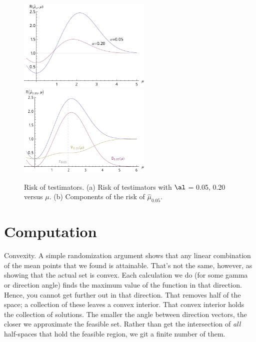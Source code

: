 \documentclass[12pt]{article}
\begin{document}
 \begin{figure}
 \caption{ \label{fig:risk} Risk of testimators. (a) Risk of testimators with
$\al$ = 0.05, 0.20 versus $\mu$. (b) Components of the risk of $\hat\mu_{0.05}$. }
 \centerline{ 
   \includegraphics[width=2.5in]{figures/risk_a}
   \includegraphics[width=2.5in]{figures/risk_b} }
 \end{figure}

 



\section{ Computation }

 
 Convexity. A simple randomization argument shows that any linear combination of
 the mean points that we found is attainable.  That's not the same, however, as
 showing that the actual set is convex.  Each calculation we do (for some gamma
 or direction angle) finds the maximum value of the function in that direction.
  Hence, you cannot get further out in that direction. That removes half of the
 space; a collection of these leaves a convex interior.  That convex interior
 holds the collection of solutions.  The smaller the angle between direction
 vectors, the closer we approximate the feasible set.  Rather than get the
 intersection of {\em all} half-spaces that hold the feasible region, we git a
 finite number of them.
\end{document}
